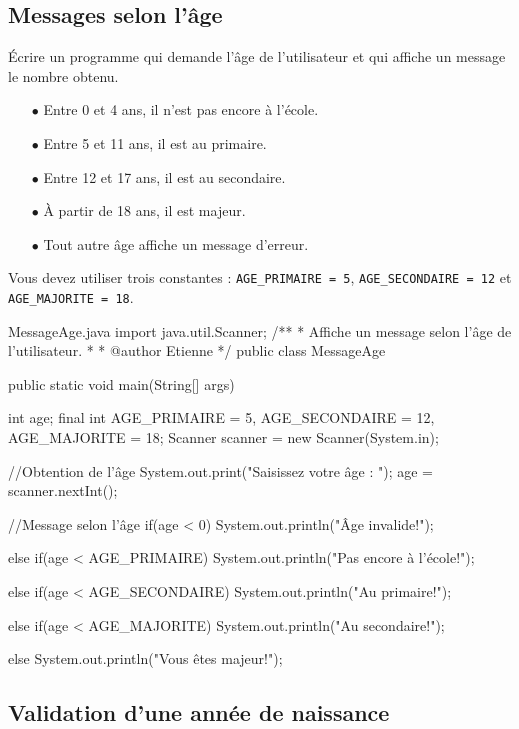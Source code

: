 \documentclass[12pt]{article}
\begin{document}
\subsection{Messages selon l'âge}

Écrire un programme qui demande l'âge de l'utilisateur et qui affiche un message le nombre obtenu. 

\begin{itemize}
	\item[$\bullet$] Entre 0 et 4 ans, il n'est pas encore à l'école.
	\item[$\bullet$] Entre 5 et 11 ans, il est au primaire.
	\item[$\bullet$] Entre 12 et 17 ans, il est au secondaire.
	\item[$\bullet$] À partir de 18 ans, il est majeur.
	\item[$\bullet$] Tout autre âge affiche un message d'erreur.
\end{itemize}

Vous devez utiliser trois constantes : \verb|AGE_PRIMAIRE = 5|, \verb|AGE_SECONDAIRE = 12| et \verb|AGE_MAJORITE = 18|.


\begin{MyTCB}{MessageAge.java}
import java.util.Scanner;
/**
 * Affiche un message selon l'âge de l'utilisateur.
 * 
 * @author Etienne
 */
public class MessageAge {

	public static void main(String[] args) {
		
		int age;
		final int AGE_PRIMAIRE = 5, AGE_SECONDAIRE = 12, AGE_MAJORITE = 18;
		Scanner scanner = new Scanner(System.in);
		
		//Obtention de l'âge
		System.out.print("Saisissez votre âge : ");
		age = scanner.nextInt();
		
		//Message selon l'âge
		if(age < 0)
			System.out.println("Âge invalide!");
		
		else if(age < AGE_PRIMAIRE)
			System.out.println("Pas encore à l'école!");
		
		else if(age < AGE_SECONDAIRE)
			System.out.println("Au primaire!");
		
		else if(age < AGE_MAJORITE)
			System.out.println("Au secondaire!");
		
		else
			System.out.println("Vous êtes majeur!");
		
	}

}
\end{MyTCB}

%
%
%
%

\subsection{Validation d'une année de naissance}
\end{document}
